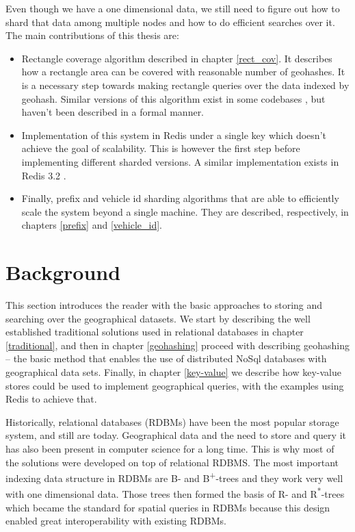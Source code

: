 \documentclass[times, utf8, diplomski]{fer}
\newcommand{\bplus}{B\textsuperscript{+}}
\newcommand{\rstar}{R\textsuperscript{*}}
\begin{document}
Even though we have a one dimensional data, we still need to figure out how to shard that data among multiple nodes and how to do efficient searches over it. The main contributions of this thesis are:
\begin{itemize}
\item Rectangle coverage algorithm described in chapter \ref{rect_cov}. It describes how a rectangle area can be covered with reasonable number of geohashes. It is a necessary step towards making rectangle queries over the data indexed by geohash. Similar versions of this algorithm exist in some codebases \cite{davidmoten}, but haven't been described in a formal manner.

\item Implementation of this system in Redis under a single key which doesn't achieve the goal of scalability. This is however the first step before implementing different sharded versions. A similar implementation exists in Redis 3.2 \cite{redis_geo}.

\item Finally, prefix and vehicle id sharding algorithms that are able to efficiently scale the system beyond a single machine. They are described, respectively, in chapters \ref{prefix} and \ref{vehicle_id}.
\end{itemize} 

\chapter{Background}
This section introduces the reader with the basic approaches to storing and searching over the geographical datasets. We start by describing the well established traditional solutions used in relational databases in chapter \ref{traditional}, and then in chapter \ref{geohashing} proceed with describing geohashing -- the basic method that enables the use of distributed NoSql databases with geographical data sets. Finally, in chapter \ref{key-value} we describe how key-value stores could be used to implement geographical queries, with the examples using Redis to achieve that.

Historically, relational databases (RDBMs) have been the most popular storage system, and still are today. Geographical data and the need to store and query it has also been present in computer science for a long time. This is why most of the solutions were developed on top of relational RDBMS. The most important indexing data structure in RDBMs are B- and \bplus-trees and they work very well with one dimensional data. Those trees then formed the basis of R- and \rstar-trees which became the standard for spatial queries in RDBMs because this design enabled great interoperability with existing RDBMs.
\end{document}
